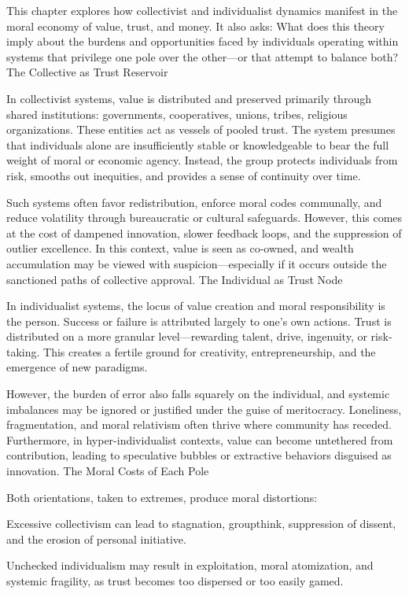 \documentclass[11pt,oneside]{book}
\begin{document}
This chapter explores how collectivist and individualist dynamics manifest in the moral economy of value, trust, and money. It also asks: What does this theory imply about the burdens and opportunities faced by individuals operating within systems that privilege one pole over the other—or that attempt to balance both?
The Collective as Trust Reservoir

In collectivist systems, value is distributed and preserved primarily through shared institutions: governments, cooperatives, unions, tribes, religious organizations. These entities act as vessels of pooled trust. The system presumes that individuals alone are insufficiently stable or knowledgeable to bear the full weight of moral or economic agency. Instead, the group protects individuals from risk, smooths out inequities, and provides a sense of continuity over time.

Such systems often favor redistribution, enforce moral codes communally, and reduce volatility through bureaucratic or cultural safeguards. However, this comes at the cost of dampened innovation, slower feedback loops, and the suppression of outlier excellence. In this context, value is seen as co-owned, and wealth accumulation may be viewed with suspicion—especially if it occurs outside the sanctioned paths of collective approval.
The Individual as Trust Node

In individualist systems, the locus of value creation and moral responsibility is the person. Success or failure is attributed largely to one’s own actions. Trust is distributed on a more granular level—rewarding talent, drive, ingenuity, or risk-taking. This creates a fertile ground for creativity, entrepreneurship, and the emergence of new paradigms.

However, the burden of error also falls squarely on the individual, and systemic imbalances may be ignored or justified under the guise of meritocracy. Loneliness, fragmentation, and moral relativism often thrive where community has receded. Furthermore, in hyper-individualist contexts, value can become untethered from contribution, leading to speculative bubbles or extractive behaviors disguised as innovation.
The Moral Costs of Each Pole

Both orientations, taken to extremes, produce moral distortions:

    Excessive collectivism can lead to stagnation, groupthink, suppression of dissent, and the erosion of personal initiative.

    Unchecked individualism may result in exploitation, moral atomization, and systemic fragility, as trust becomes too dispersed or too easily gamed.
\end{document}
